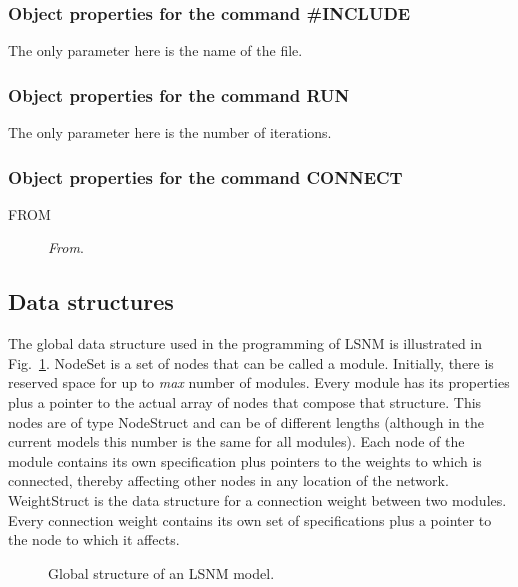 \documentclass[12pt]{article}
\begin{document}
\subsubsection{Object properties for the command \#INCLUDE}
The only parameter here is the name of the file.

\subsubsection{Object properties for the command RUN}
The only parameter here is the number of iterations.

\subsubsection{Object properties for the command CONNECT}
\begin{description}
  \item[FROM] {\em From}. 
\end{description}

\subsection{Data structures}
The global data structure used in the programming of LSNM is
illustrated in Fig.~\ref{structure}. NodeSet is a set of nodes that
can be called a module. Initially, there is reserved space for up to
{\em max} number of modules. Every module has its properties plus a
pointer to the actual array of nodes that compose that structure. This
nodes are of type NodeStruct and can be of different lengths (although
in the current models this number is the same for all modules). Each
node of the module contains its own specification plus pointers to the
weights to which is connected, thereby affecting other nodes in any
location of the network. WeightStruct is the data structure for a
connection weight between two modules. Every connection weight
contains its own set of specifications plus a pointer to the node to
which it affects. 
\begin{figure}[htp]
  \centerline{}
  \caption{Global structure of an LSNM model. }
  \label{structure}
\end{figure}
\end{document}
